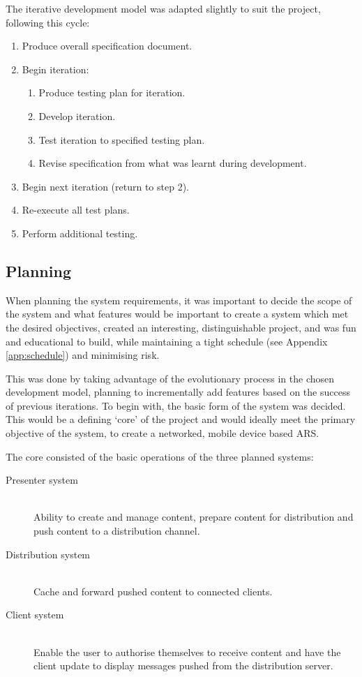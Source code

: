 \documentclass[a4papert,11pt,notitlepage]{ltxdoc}
\begin{document}
The iterative development model was adapted slightly to suit the project, following this cycle:
\begin{enumerate}
\item Produce overall specification document.
\item Begin iteration:
\begin{enumerate}
\item Produce testing plan for iteration.
\item Develop iteration.
\item Test iteration to specified testing plan.
\item Revise specification from what was learnt during development.
\end{enumerate}
\item Begin next iteration (return to step 2).
\item Re-execute all test plans.
\item Perform additional testing.
\end{enumerate}

\subsection{Planning}
When planning the system requirements, it was important to decide the scope of the system and what features would be important to create a system which met the desired objectives, created an interesting, distinguishable project, and was fun and educational to build, while maintaining a tight schedule (see Appendix \ref{app:schedule}) and minimising risk.

This was done by taking advantage of the evolutionary process in the chosen development model, planning to incrementally add features based on the success of previous iterations. To begin with, the basic form of the system was decided. This would be a defining `core' of the project and would ideally meet the primary objective of the system, to create a networked, mobile device based ARS.

The core consisted of the basic operations of the three planned systems:
\begin{description}
\item[Presenter system] \hfill \\
Ability to create and manage content, prepare content for distribution and push content to a distribution channel.
\item[Distribution system] \hfill \\
Cache and forward pushed content to connected clients.
\item[Client system] \hfill \\
Enable the user to authorise themselves to receive content and have the client update to display messages pushed from the distribution server.
\end{description}
\end{document}
